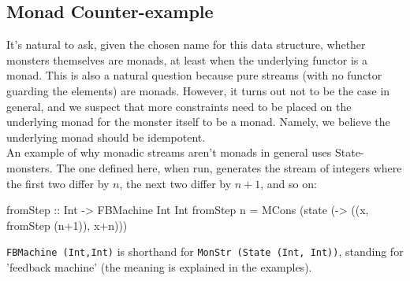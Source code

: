 

%

\subsection{Monad Counter-example}

It's natural to ask, given the chosen name for this data structure, whether monsters themselves are monads, at least when the underlying functor is a monad. This is also a natural question because pure streams (with no functor guarding the elements) are monads. However, it turns out not to be the case in general, and we suspect that more constraints need to be placed on the underlying monad for the monster itself to be a monad. Namely, we believe the underlying monad should be idempotent. \\

An example of why monadic streams aren't monads in general uses State-monsters. The one defined here, when run, generates the stream of integers where the first two differ by $n$, the next two differ by $n+1$, and so on:
\begin{haskell}
fromStep :: Int -> FBMachine Int Int
fromStep n = MCons (state (\x -> ((x, fromStep (n+1)), x+n)))
\end{haskell}
\verb+FBMachine (Int,Int)+ is shorthand for \verb+MonStr (State (Int, Int))+, standing for 'feedback machine' (the meaning is explained in the examples).

